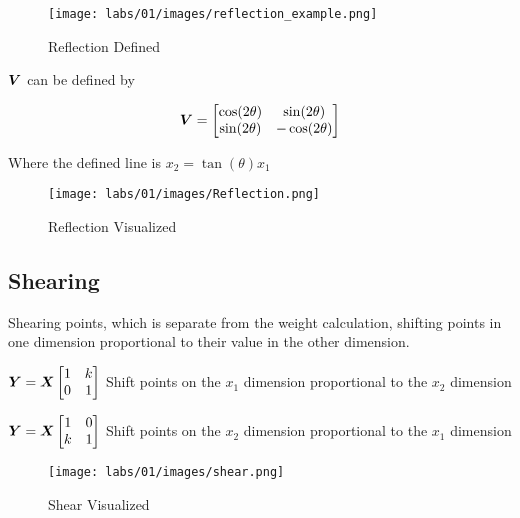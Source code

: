 \begin{figure}[ht]
\begin{center}
\texttt{[image: labs/01/images/reflection\_example.png]}
\end{center} 
\caption{Reflection Defined}
\end{figure}


\(\matr{V}\) can be defined by

\[
\matr{V} = 
\begin{bmatrix}
    \cos(2\theta) & \sin(2\theta)\\
    \sin(2\theta) & -\cos(2\theta)
\end{bmatrix}
\]

Where the defined line is \(x_2 = \tan(\theta) x_1 \)

\begin{figure}[ht]
\begin{center}
\texttt{[image: labs/01/images/Reflection.png]}
\end{center} 
\caption{Reflection Visualized}
\end{figure}

\subsection{Shearing}
Shearing points, which is separate from the weight calculation, shifting points in one dimension proportional to their value in the other dimension.

\(\matr{Y} = \matr{X}  \begin{bmatrix}
    1 & k\\
    0 & 1
\end{bmatrix} \) 
Shift points on the \(x_1\) dimension proportional to the \(x_2\) dimension

\(\matr{Y} = \matr{X}  \begin{bmatrix}
    1 & 0\\
    k & 1
\end{bmatrix} \)
Shift points on the \(x_2\) dimension proportional to the \(x_1\) dimension

\begin{figure}[ht]
\begin{center}
\texttt{[image: labs/01/images/shear.png]}
\end{center} 
\caption{Shear Visualized}
\end{figure}

